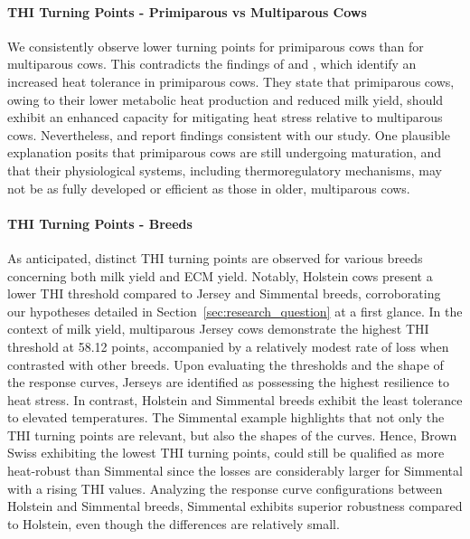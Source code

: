 \paragraph{THI Turning Points - Primiparous vs Multiparous Cows}
We consistently observe lower turning points for primiparous cows than for multiparous cows. This contradicts the findings of \cite{bernabucci_effect_2015, west_effects_2003} and \cite{becker_invited_2020}, which identify an increased heat tolerance in primiparous cows. They state that primiparous cows, owing to their lower metabolic heat production and reduced milk yield, should exhibit an enhanced capacity for mitigating heat stress relative to multiparous cows. Nevertheless, \cite{maggiolino_effect_2022} and \cite{vinet_estimation_2023} report findings consistent with our study. One plausible explanation posits that primiparous cows are still undergoing maturation, and that their physiological systems, including thermoregulatory mechanisms, may not be as fully developed or efficient as those in older, multiparous cows. 

\paragraph{THI Turning Points - Breeds}
As anticipated, distinct THI turning points are observed for various breeds concerning both milk yield and ECM yield. Notably, Holstein cows present a lower THI threshold compared to Jersey and Simmental breeds, corroborating our hypotheses detailed in Section~\ref{sec:research_question} at a first glance. In the context of milk yield, multiparous Jersey cows demonstrate the highest THI threshold at 58.12 points, accompanied by a relatively modest rate of loss when contrasted with other breeds. Upon evaluating the thresholds and the shape of the response curves, Jerseys are identified as possessing the highest resilience to heat stress. In contrast, Holstein and Simmental breeds exhibit the least tolerance to elevated temperatures. The Simmental example highlights that not only the THI turning points are relevant, but also the shapes of the curves. Hence, Brown Swiss exhibiting the lowest THI turning points, could still be qualified as more heat-robust than Simmental since the losses are considerably larger for Simmental with a rising THI values. Analyzing the response curve configurations between Holstein and Simmental breeds, Simmental exhibits superior robustness compared to Holstein, even though the differences are relatively small.

